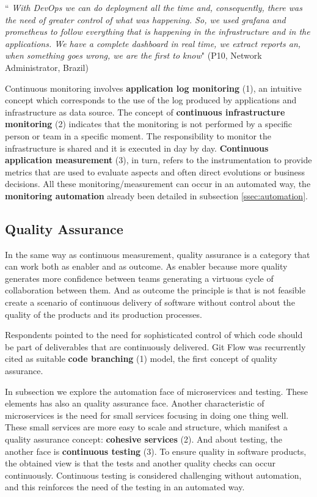\begin{mq}
``\emph{
With DevOps we can do deployment all the time and, consequently, there was
the need of greater control of what was happening. So, we used grafana and
prometheus to follow everything that is happening in the infrastructure and in
the applications. We have a complete dashboard in real time, we extract reports
an, when something goes wrong, we are the first to know}" (P10, Network
Administrator, Brazil)
\end{mq}

Continuous monitoring involves \textbf{application log monitoring} (1), an
intuitive concept which corresponds to the use of the log produced by
applications and infrastructure as data source. The concept of
\textbf{continuous infrastructure monitoring} (2) indicates that the monitoring
is not performed by a specific person or team in a specific moment. The
responsibility to monitor the infrastructure is shared and it is executed in
day by day. \textbf{Continuous application measurement} (3), in turn, refers to
the instrumentation to provide metrics that are used to evaluate aspects and
often direct evolutions or business decisions. All these monitoring/measurement
can occur in an automated way, the \textbf{monitoring automation} already been
detailed in subsection \ref{ssec:automation}.

\subsection{Quality Assurance}

In the same way as continuous measurement, quality assurance is a category that
can work both as enabler and as outcome. As enabler because more quality
generates more confidence between teams generating a virtuous cycle of
collaboration between them. And as outcome the principle is that is not
feasible create a scenario of continuous delivery of software without control
about the quality of the products and its production processes.

Respondents pointed to the need for sophisticated control of which code should
be part of deliverables that are continuously delivered. Git Flow was
recurrently cited as suitable \textbf{code branching} (1) model, the first
concept of quality assurance.

In subsection \label{ssec:automation} we explore the automation face of
microservices and testing. These elements has also an quality assurance face.
Another characteristic of microservices is the need for small services focusing
in doing one thing well. These small services are more easy to scale and
structure, which manifest a quality assurance concept: \textbf{cohesive
services} (2). And about testing, the another face is \textbf{continuous
testing} (3). To ensure quality in software products, the obtained view is that
the tests and another quality checks can occur continuously. Continuous testing
is considered challenging without automation, and this reinforces the need of
the testing in an automated way.

